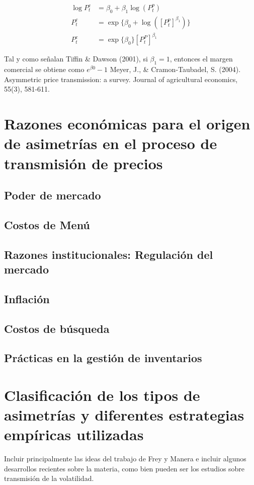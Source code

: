 \documentclass[12pt, twoside]{book}\usepackage[]{graphicx}\usepackage[]{color}
\numberwithin{equation}{section}
\numberwithin{theorem}{section}
\numberwithin{teorema}{section}
\numberwithin{defi}{section}
\numberwithin{prop}{section}
\numberwithin{defi}{section}
\theoremstyle{plain}
\begin{document}
\begin{align}
\log P_{t}^{c} & = \beta_{0}+\beta_1 \log(P_{t}^{p}) \\ 
P_{t}^{c} & = \exp\{\beta_{0}+ \log([P_{t}^{p}]^{\beta_{1}})\} \\
P_{t}^{c} & = \exp\{\beta_{0}\}[P_{t}^{P}]^{\beta_1} \label{margen}
\end{align}

Tal y como señalan Tiffin \& Dawson (2001), si $\beta_{1}=1$, entonces el margen comercial se obtiene como $e^{\beta0}-1$
Meyer, J., \& Cramon‐Taubadel, S. (2004). Asymmetric price transmission: a survey. Journal of agricultural economics, 55(3), 581-611.

\section{Razones económicas para el origen de asimetrías en el proceso de transmisión de precios}
\subsection{Poder de mercado}
\subsection{Costos de Menú}
\subsection{Razones institucionales: Regulación del mercado}
\subsection{Inflación}
\subsection{Costos de búsqueda}
\subsection{Prácticas en la gestión de inventarios}

\section{Clasificación de los tipos de asimetrías y diferentes estrategias empíricas utilizadas}

Incluir principalmente las ideas del trabajo de Frey y Manera e incluir algunos desarrollos recientes sobre la materia, como bien pueden ser los estudios sobre transmisión de la volatilidad. 
\end{document}
